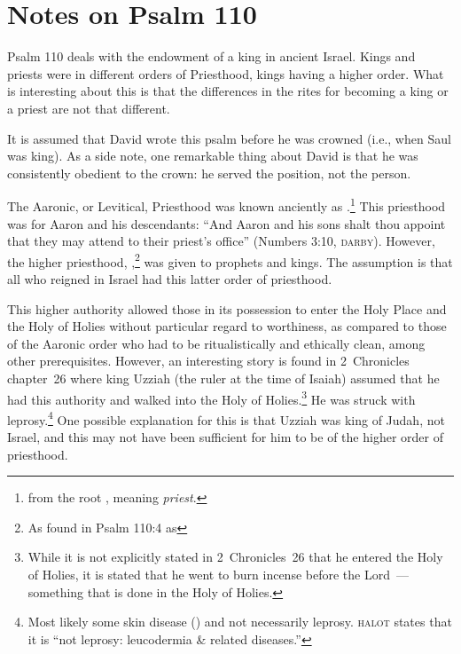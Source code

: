 \section{Notes on Psalm 110}\label{app:psalm-110}
Psalm 110 deals with the endowment of a king in ancient Israel. Kings and priests were in different orders of Priesthood, kings having a higher order. What is interesting about this is that the differences in the rites for becoming a king or a priest are not that different.

It is assumed that David wrote this psalm before he was crowned (i.e., when Saul was king). As a side note, one remarkable thing about David is that he was consistently obedient to the crown: he served the position, not the person.

The Aaronic, or Levitical, Priesthood was known anciently as .\footnote{from the root , meaning \emph{priest}.} This priesthood was for Aaron and his descendants: ``And Aaron and his sons shalt thou appoint that they may attend to their priest's office'' (Numbers 3:10, \textsc{darby}). However, the higher priesthood, ,\footnote{As found in Psalm 110:4 as } was given to prophets and kings. The assumption is that all who reigned in Israel had this latter order of priesthood.

This higher authority allowed those in its possession to enter the Holy Place and the Holy of Holies without particular regard to worthiness, as compared to those of the Aaronic order who had to be ritualistically and ethically clean, among other prerequisites. However, an interesting story is found in 2~Chronicles chapter~26 where king Uzziah (the ruler at the time of Isaiah) assumed that he had this authority and walked into the Holy of Holies.\footnote{While it is not explicitly stated in 2~Chronicles~26 that he entered the Holy of Holies, it is stated that he went to burn incense before the Lord~--- something that is done in the Holy of Holies.} He was struck with leprosy.\footnote{Most likely some skin disease () and not necessarily leprosy. \textsc{halot} states that it is ``not leprosy: leucodermia \& related diseases.''} One possible explanation for this is that Uzziah was king of Judah, not Israel, and this may not have been sufficient for him to be of the higher order of priesthood.
